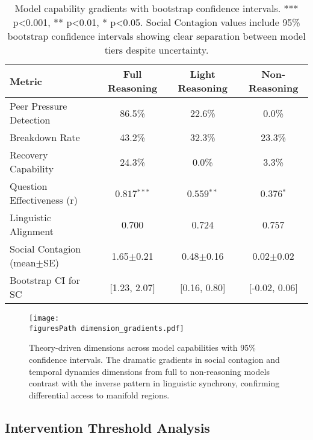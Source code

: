 \documentclass[11pt,letterpaper]{article}
\newcommand{\socialContagionFullMean}{1.65}
\newcommand{\socialContagionFullSE}{0.21}
\newcommand{\socialContagionFullCI}{[1.23, 2.07]}
\newcommand{\socialContagionLightMean}{0.48}
\newcommand{\socialContagionLightSE}{0.16}
\newcommand{\socialContagionLightCI}{[0.16, 0.80]}
\newcommand{\socialContagionNoMean}{0.02}
\newcommand{\socialContagionNoSE}{0.02}
\newcommand{\socialContagionNoCI}{[-0.02, 0.06]}
\newcommand{\fullReasoningPeerPressure}{86.5\%}
\newcommand{\lightReasoningPeerPressure}{22.6\%}
\newcommand{\nonReasoningPeerPressure}{0.0\%}
\newcommand{\fullReasoningBreakdown}{43.2\%}
\newcommand{\lightReasoningBreakdown}{32.3\%}
\newcommand{\nonReasoningBreakdown}{23.3\%}
\newcommand{\fullReasoningRecovery}{24.3\%}
\newcommand{\lightReasoningRecovery}{0.0\%}
\newcommand{\nonReasoningRecovery}{3.3\%}
\newcommand{\fullQuestionCorrelation}{0.817}
\newcommand{\lightQuestionCorrelation}{0.559}
\newcommand{\nonQuestionCorrelation}{0.376}
\newcommand{\fullLinguisticAlignment}{0.700}
\newcommand{\lightLinguisticAlignment}{0.724}
\newcommand{\nonLinguisticAlignment}{0.757}
\newcommand{\figuresPath}{../analysis/rigorous_analysis_outputs/figures/}
\begin{document}
\begin{table}[h]
\centering
\begin{tabular}{lccc}
\toprule
Metric & Full Reasoning & Light Reasoning & Non-Reasoning \\
\midrule
Peer Pressure Detection & \fullReasoningPeerPressure{} & \lightReasoningPeerPressure{} & \nonReasoningPeerPressure{} \\
Breakdown Rate & \fullReasoningBreakdown{} & \lightReasoningBreakdown{} & \nonReasoningBreakdown{} \\
Recovery Capability & \fullReasoningRecovery{} & \lightReasoningRecovery{} & \nonReasoningRecovery{} \\
Question Effectiveness (r) & $\fullQuestionCorrelation{}^{***}$ & $\lightQuestionCorrelation{}^{**}$ & $\nonQuestionCorrelation{}^{*}$ \\
Linguistic Alignment & \fullLinguisticAlignment{} & \lightLinguisticAlignment{} & \nonLinguisticAlignment{} \\
Social Contagion (mean$\pm$SE) & \socialContagionFullMean{}$\pm$\socialContagionFullSE{} & \socialContagionLightMean{}$\pm$\socialContagionLightSE{} & \socialContagionNoMean{}$\pm$\socialContagionNoSE{} \\
Bootstrap CI for SC & \socialContagionFullCI{} & \socialContagionLightCI{} & \socialContagionNoCI{} \\
\bottomrule
\end{tabular}
\caption{Model capability gradients with bootstrap confidence intervals. *** p<0.001, ** p<0.01, * p<0.05. Social Contagion values include 95\% bootstrap confidence intervals showing clear separation between model tiers despite uncertainty.}
\label{tab:capability_gradients}
\end{table}

\begin{figure}[htbp]
\centering
\texttt{[image: \\figuresPath dimension\_gradients.pdf]}
\caption{Theory-driven dimensions across model capabilities with 95\% confidence intervals. The dramatic gradients in social contagion and temporal dynamics dimensions from full to non-reasoning models contrast with the inverse pattern in linguistic synchrony, confirming differential access to manifold regions.}
\label{fig:dimension_gradients}
\end{figure}

\subsection{Intervention Threshold Analysis}
\end{document}
